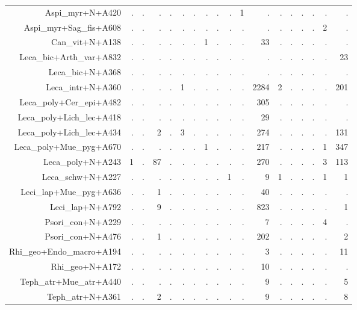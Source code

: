 \documentclass[a4paper, 11]{article}\usepackage[]{graphicx}\usepackage[]{color}
\begin{document}
\begin{table}
\begin{tabular}{rrrrrrrrrrrrrrrrrr}
  Aspi\_myr+N+A420 & . & . & . & . & . & . & . & . & . & 1 & . & . & . & . & . & . & . \\ 
  Aspi\_myr+Sag\_fis+A608 & . & . & . & . & . & . & . & . & . & . & . & . & . & . & . & 2 & . \\ 
  Can\_vit+N+A138 & . & . & . & . & . & . & 1 & . & . & . & 33 & . & . & . & . & . & . \\ 
  Leca\_bic+Arth\_var+A832 & . & . & . & . & . & . & . & . & . & . & . & . & . & . & . & . & 23 \\ 
  Leca\_bic+N+A368 & . & . & . & . & . & . & . & . & . & . & . & . & . & . & . & . & . \\ 
  Leca\_intr+N+A360 & . & . & . & . & 1 & . & . & . & . & . & 2284 & 2 & . & . & . & . & 201 \\ 
  Leca\_poly+Cer\_epi+A482 & . & . & . & . & . & . & . & . & . & . & 305 & . & . & . & . & . & . \\ 
  Leca\_poly+Lich\_lec+A418 & . & . & . & . & . & . & . & . & . & . & 29 & . & . & . & . & . & . \\ 
  Leca\_poly+Lich\_lec+A434 & . & . & 2 & . & 3 & . & . & . & . & . & 274 & . & . & . & . & . & 131 \\ 
  Leca\_poly+Mue\_pyg+A670 & . & . & . & . & . & . & 1 & . & . & . & 217 & . & . & . & . & 1 & 347 \\ 
  Leca\_poly+N+A243 & 1 & . & 87 & . & . & . & . & . & . & . & 270 & . & . & . & . & 3 & 113 \\ 
  Leca\_schw+N+A227 & . & . & . & . & . & . & . & . & 1 & . & 9 & 1 & . & . & . & 1 & 1 \\ 
  Leci\_lap+Mue\_pyg+A636 & . & . & 1 & . & . & . & . & . & . & . & 40 & . & . & . & . & . & . \\ 
  Leci\_lap+N+A792 & . & . & 9 & . & . & . & . & . & . & . & 823 & . & . & . & . & . & 1 \\ 
  Psori\_con+N+A229 & . & . & . & . & . & . & . & . & . & . & 7 & . & . & . & . & 4 & . \\ 
  Psori\_con+N+A476 & . & . & 1 & . & . & . & . & . & . & . & 202 & . & . & . & . & . & 2 \\ 
  Rhi\_geo+Endo\_macro+A194 & . & . & . & . & . & . & . & . & . & . & 3 & . & . & . & . & . & 11 \\ 
  Rhi\_geo+N+A172 & . & . & . & . & . & . & . & . & . & . & 10 & . & . & . & . & . & . \\ 
  Teph\_atr+Mue\_atr+A440 & . & . & . & . & . & . & . & . & . & . & 9 & . & . & . & . & . & 5 \\ 
  Teph\_atr+N+A361 & . & . & 2 & . & . & . & . & . & . & . & 9 & . & . & . & . & . & 8 \\ 

\end{tabular}
\end{table}
\end{document}
